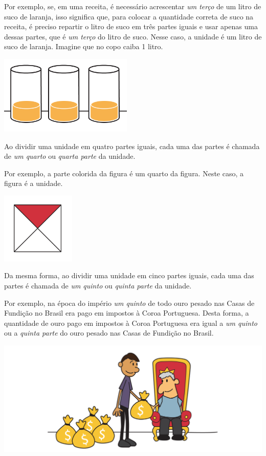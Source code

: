 Por exemplo, se, em uma receita, é necessário acrescentar {\it um terço} de um litro de suco de laranja, isso significa que, para colocar a quantidade correta de suco na receita, é preciso repartir o litro de suco em três partes iguais e usar apenas uma dessas partes, que é {\it um terço} do litro de suco. Nesse caso, a unidade é um litro de suco de laranja. Imagine que no copo caiba 1 litro.

\begin{center}
    \includegraphics[width=180pt, keepaspectratio]{..//media/cap1/secoes/pngs_licao_01/orgideias_fig03a.png}  
  \end{center}

Ao dividir uma unidade em quatro partes iguais, cada uma das partes é chamada de {\it um quarto} ou {\it quarta parte} da unidade. 

Por exemplo, a parte colorida da figura é um quarto da figura. Neste caso, a figura é a unidade.

\begin{center}
    \includegraphics[width=100pt, keepaspectratio]{..//media/cap1/secoes/pngs_licao_01/orgideias_fig04.png}  
  \end{center}
Da mesma forma, ao dividir uma unidade em cinco partes iguais, cada uma das partes é chamada de {\it um quinto} ou {\it quinta parte} da unidade.

Por exemplo, na época do império \emph{um quinto} de todo ouro pesado nas Casas de Fundição no Brasil era pago em impostos à Coroa Portuguesa. Desta forma, a quantidade de ouro pago em impostos à Coroa Portuguesa era igual a \emph{um quinto} ou a \emph{quinta parte} do ouro pesado nas Casas de Fundição no Brasil.

\begin{center}
    \includegraphics[width=400pt, keepaspectratio]{..//media/cap1/secoes/pngs_licao_01/orgideias_fig05.png}  
  \end{center}
\clearpage

